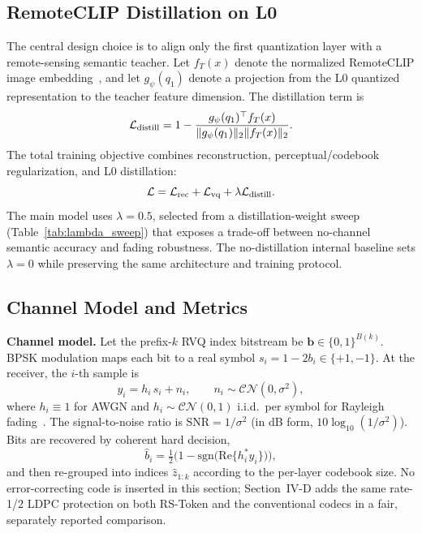 \documentclass[lettersize,journal]{IEEEtran}
\begin{document}
\subsection{RemoteCLIP Distillation on L0}
The central design choice is to align only the first quantization layer with a remote-sensing semantic teacher. Let $f_T(x)$ denote the normalized RemoteCLIP image embedding~\cite{liu2024remoteclip}, and let $g_\psi(q_1)$ denote a projection from the L0 quantized representation to the teacher feature dimension. The distillation term is
\begin{equation}
    \mathcal{L}_{\rm distill}=1-\frac{g_\psi(q_1)^\top f_T(x)}{\|g_\psi(q_1)\|_2\|f_T(x)\|_2}.
\end{equation}
The total training objective combines reconstruction, perceptual/codebook regularization, and L0 distillation:
\begin{equation}
    \mathcal{L}=\mathcal{L}_{\rm rec}+\mathcal{L}_{\rm vq}+\lambda\mathcal{L}_{\rm distill}.
\end{equation}
The main model uses $\lambda=0.5$, selected from a distillation-weight sweep (Table~\ref{tab:lambda_sweep}) that exposes a trade-off between no-channel semantic accuracy and fading robustness. The no-distillation internal baseline sets $\lambda=0$ while preserving the same architecture and training protocol.

\subsection{Channel Model and Metrics}
\textbf{Channel model.} Let the prefix-$k$ RVQ index bitstream be $\mathbf{b}\in\{0,1\}^{B(k)}$. BPSK modulation maps each bit to a real symbol $s_i = 1 - 2 b_i \in \{+1,-1\}$. At the receiver, the $i$-th sample is
\begin{equation}
    y_i = h_i\, s_i + n_i, \qquad n_i \sim \mathcal{CN}(0,\sigma^2),
\end{equation}
where $h_i \equiv 1$ for AWGN and $h_i \sim \mathcal{CN}(0,1)$ i.i.d.\ per symbol for Rayleigh fading~\cite{proakis}. The signal-to-noise ratio is $\mathrm{SNR}=1/\sigma^2$ (in dB form, $10\log_{10}(1/\sigma^2)$). Bits are recovered by coherent hard decision,
\begin{equation}
    \hat{b}_i = \tfrac{1}{2}\bigl(1 - \mathrm{sgn}\bigl(\mathrm{Re}\{h_i^{*} y_i\}\bigr)\bigr),
\end{equation}
and then re-grouped into indices $\hat{z}_{1:k}$ according to the per-layer codebook size. No error-correcting code is inserted in this section; Section~IV-D adds the same rate-1/2 LDPC protection on both RS-Token and the conventional codecs in a fair, separately reported comparison.
\end{document}
